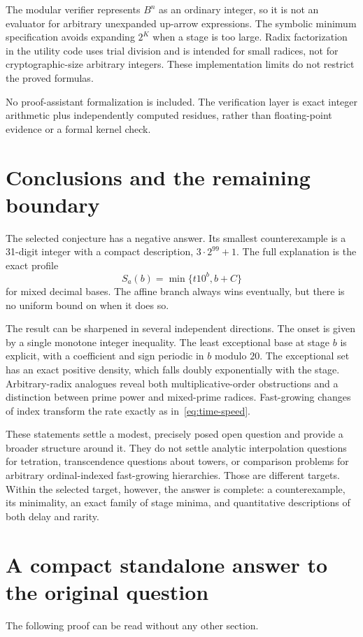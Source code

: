 \documentclass[11pt,a4paper]{article}
\theoremstyle{definition}
\begin{document}
The modular verifier represents $B^n$ as an ordinary integer, so it is not
an evaluator for arbitrary unexpanded up-arrow expressions. The symbolic
minimum specification avoids expanding $2^K$ when a stage is too large.
Radix factorization in the utility code uses trial division and is intended
for small radices, not for cryptographic-size arbitrary integers. These
implementation limits do not restrict the proved formulas.

No proof-assistant formalization is included. The verification layer is
exact integer arithmetic plus independently computed residues, rather than
floating-point evidence or a formal kernel check.

\section{Conclusions and the remaining boundary}\label{sec:conclusions}

The selected conjecture has a negative answer. Its smallest counterexample
is a 31-digit integer with a compact description, $3\cdot2^{99}+1$.
The full explanation is the exact profile
\[
S_a(b)=\min\{t10^b,b+C\}
\]
for mixed decimal bases. The affine branch always wins eventually, but
there is no uniform bound on when it does so.

The result can be sharpened in several independent directions. The onset
is given by a single monotone integer inequality. The least exceptional
base at stage $b$ is explicit, with a coefficient and sign periodic in
$b$ modulo $20$. The exceptional set has an exact positive density, which
falls doubly exponentially with the stage. Arbitrary-radix analogues reveal
both multiplicative-order obstructions and a distinction between prime
power and mixed-prime radices. Fast-growing changes of index transform the
rate exactly as in~\eqref{eq:time-speed}.

These statements settle a modest, precisely posed open question and provide
a broader structure around it. They do not settle analytic interpolation
questions for tetration, transcendence questions about towers, or comparison
problems for arbitrary ordinal-indexed fast-growing hierarchies. Those are
different targets. Within the selected target, however, the answer is
complete: a counterexample, its minimality, an exact family of stage minima,
and quantitative descriptions of both delay and rarity.

\clearpage
\appendix
\section{A compact standalone answer to the original question}\label{app:short}
The following proof can be read without any other section.
\end{document}
